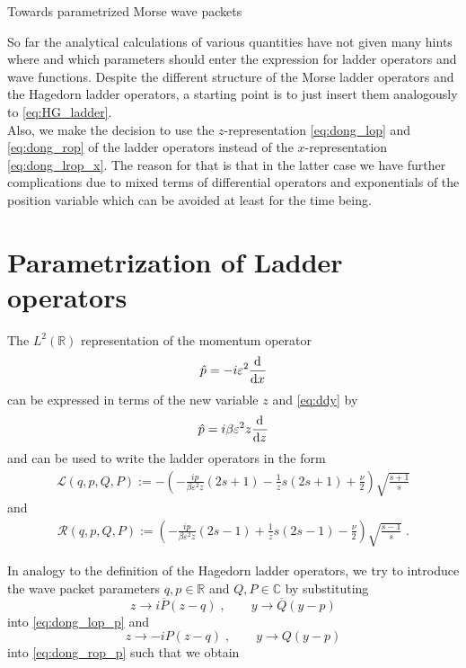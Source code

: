 \begin{chapter}{Towards parametrized Morse wave packets}

So far the analytical calculations of various quantities have not given many hints where and which parameters should enter the expression for ladder operators and wave functions. Despite the different structure of the Morse ladder operators and the Hagedorn ladder operators, a starting point is to just insert them analogously to \eqref{eq:HG_ladder}.\\

Also, we make the decision to use the $z$-representation \eqref{eq:dong_lop} and \eqref{eq:dong_rop} of the ladder operators instead of
the $x$-representation \eqref{eq:dong_lrop_x}. The reason for that is that in the latter case we have further complications due to 
mixed terms of differential operators and exponentials of the position variable which can be avoided at least for the time being.

\section{Parametrization of Ladder operators } %
\label{sec:Parametrization of Ladder }


The $L^2(\mathbb{R})$ representation of the momentum operator
\begin{equation}
   \hat{p}=-i\varepsilon^2\frac{\mathrm{d}^{}}{\mathrm{d}x^{}}
\end{equation}
can be expressed in terms of the new variable $z$ and \eqref{eq:ddy} by
\begin{equation}
    \label{eq:piny}
    \hat{p}=i\beta\varepsilon^2 z\frac{\mathrm{d}^{}}{\mathrm{d}z^{}}
\end{equation}
and can be used to write the ladder operators in the form
\begin{align}
    \label{eq:dong_lop_p}
    \mathcal{L}(q,p,Q,P):=-\left(-\frac{i p}{\beta\varepsilon^2 z}(2s+1)-\frac{1}{z}s(2s+1)+\frac{\nu}{2} \right)\sqrt{\frac{s+1}{s}}
\end{align}
and
\begin{align}
    \label{eq:dong_rop_p}
    \mathcal{R}(q,p,Q,P):=\left(-\frac{i p}{\beta\varepsilon^2 z }(2s-1)+\frac{1}{z}s(2s-1)-\frac{\nu}{2} \right)\sqrt{\frac{s-1}{s}}\;.
\end{align}

In analogy to the definition of the Hagedorn ladder operators, we try to introduce 
the wave packet parameters $q, p\in\mathbb{R}$ and $Q, P\in\mathbb{C}$ by substituting
\begin{equation}
    \label{eq:param_subst1}
    z\rightarrow i\overline{P}(z-q)\;,\qquad y\to \overline{Q}(y-p)
\end{equation}
into \eqref{eq:dong_lop_p} 
and
\begin{equation}
    \label{eq:param_subst2}
    z\rightarrow -iP(z-q)\;,\qquad y\to Q(y-p)
\end{equation}
into \eqref{eq:dong_rop_p} such that we obtain


\end{chapter}
